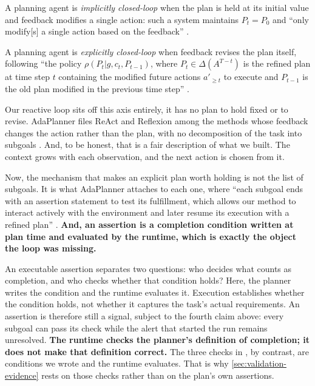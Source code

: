 \begin{definition}
\label{def:implicit-closed-loop}
A planning agent is \emph{implicitly closed-loop} when the plan is held at its 
initial value and feedback modifies a single action: such a system maintains 
$P_t = P_0$ and ``only modify[s] a single action based on the feedback'' \citep[\S2]{sun2023adaplanner}. 
\end{definition}

\begin{definition}
\label{def:closed-loop}
A planning agent is \emph{explicitly closed-loop} when feedback revises the plan itself, 
following ``the policy $\rho(P_t|g, c_t, P_{t-1})$, where $P_t \in \Delta(A^{T-t})$ is the refined plan 
at time step $t$ containing the modified future actions $a'_{\geq t}$ to execute and $P_{t-1}$ is the 
old plan modified in the previous time step'' \citep[\S2]{sun2023adaplanner}.
\end{definition}

Our reactive loop sits off this axis entirely, it has no plan to hold fixed or to revise. AdaPlanner
files ReAct and Reflexion among the methods whose feedback changes the action rather than the plan,
with no decomposition of the task into subgoals \citep[Table~1]{sun2023adaplanner}. And, to
be honest, that is a fair description of what we built. The context grows with each observation, 
and the next action is chosen from it.

Now, the mechanism that makes an explicit plan worth holding is not the list of subgoals. It is what
AdaPlanner attaches to each one, where ``each subgoal ends with an assertion statement to test its
fulfillment, which allows our method to interact actively with the environment and later resume its
execution with a refined plan'' \citep[\S3.1]{sun2023adaplanner}. \textbf{And, an assertion is a
completion condition written at plan time and evaluated by the runtime, which is exactly the object
the loop was missing.}

An executable assertion separates two questions: who decides what counts as completion, and who
checks whether that condition holds? Here, the planner writes the condition and the runtime
evaluates it. Execution establishes whether the condition holds, not whether it captures the task's
actual requirements. An assertion is therefore still a signal, subject to the fourth claim above:
every subgoal can pass its check while the alert that started the run remains unresolved.
\textbf{The runtime checks the planner's definition of completion; it does not make that definition
correct.} The three checks in , by contrast, are conditions we wrote and the runtime
evaluates. That is why \cref{sec:validation-evidence} rests on those checks rather than on the
plan's own assertions.

